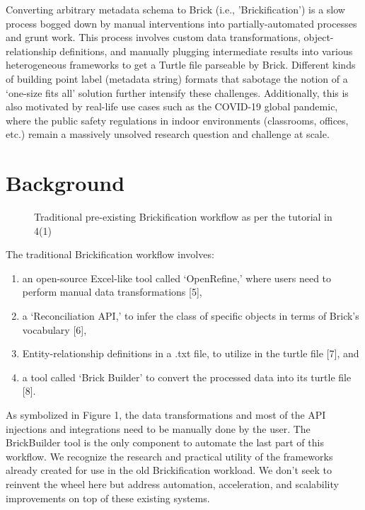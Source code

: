 \documentclass[twocolumn, switch]{article} %
\begin{document}
Converting arbitrary metadata schema to Brick (i.e., 'Brickification') is a slow process bogged down by manual interventions into partially-automated processes and grunt work. This process involves custom data transformations, object-relationship definitions, and manually plugging intermediate results into various heterogeneous frameworks to get a Turtle file parseable by Brick. Different kinds of building point label (metadata string) formats that sabotage the notion of a ‘one-size fits all’ solution further intensify these challenges.  Additionally, this is also motivated by real-life use cases such as the COVID-19 global pandemic, where the public safety regulations in indoor environments (classrooms, offices, etc.) remain a massively unsolved research question and challenge at scale.


\section{Background}

\begin{figure}[H]
  \centering
  \caption{ Traditional pre-existing Brickification workflow as per the tutorial in 4(1) }
  \label{fig:fig1}
\end{figure}

The traditional Brickification workflow involves:
\begin{enumerate}
    \item an open-source Excel-like tool called ‘OpenRefine,’ where users need to perform manual data transformations [5],
    \item a ‘Reconciliation API,’ to infer the class of specific objects in terms of Brick’s vocabulary [6],
    \item Entity-relationship definitions in a .txt file, to utilize in the turtle file [7], and
    \item a tool called ‘Brick Builder’ to convert the processed data into its turtle file [8].
\end{enumerate}
As symbolized in Figure 1, the data transformations and most of the API injections and integrations need to be manually done by the user. The BrickBuilder tool is the only component to automate the last part of this workflow. We recognize the research and practical utility of the frameworks already created for use in the old Brickification workload. We don’t seek to reinvent the wheel here but address automation, acceleration, and scalability improvements on top of these existing systems.
\end{document}
